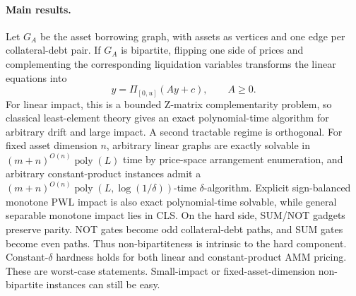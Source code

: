 \documentclass{llncs}
\newcommand{\clip}{\Pi}
\newcommand{\GA}{G_A}
\newcommand{\poly}{\operatorname{poly}}
\begin{document}
\paragraph{Main results.}
Let \(\GA\) be the asset borrowing graph, with assets as vertices and one edge per collateral-debt pair.  If \(\GA\) is bipartite, flipping one side of prices and complementing the corresponding liquidation variables transforms the linear equations into
\[
       y=\clip_{[0,u]}(Ay+c),\qquad A\ge 0.
\]
For linear impact, this is a bounded Z-matrix complementarity problem, so classical least-element theory gives an exact polynomial-time algorithm for arbitrary drift and large impact.  A second tractable regime is orthogonal. For fixed asset dimension \(n\), arbitrary linear graphs are exactly solvable in \((m+n)^{O(n)}\poly(L)\) time by price-space arrangement enumeration, and arbitrary constant-product instances admit a \((m+n)^{O(n)}\poly(L,\log(1/\delta))\)-time \(\delta\)-algorithm.  Explicit sign-balanced monotone PWL impact is also exact polynomial-time solvable, while general separable monotone impact lies in CLS.  On the hard side, SUM/NOT gadgets preserve parity. NOT gates become odd collateral-debt paths, and SUM gates become even paths. Thus non-bipartiteness is intrinsic to the hard component.  Constant-\(\delta\) hardness holds for both linear and constant-product AMM pricing. These are worst-case statements. Small-impact or fixed-asset-dimension non-bipartite instances can still be easy.
\end{document}
